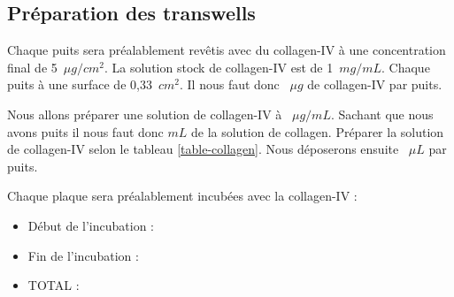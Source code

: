 \subsection{Préparation des transwells}

Chaque puits sera préalablement revêtis avec du collagen-IV à une concentration final de 5~$\mu g/cm^2$. La solution stock de collagen-IV est de  1~$mg/mL$. Chaque puits à une surface de 0,33~$cm^2$. Il nous faut donc ~$\mu g$ de collagen-IV par puits.


Nous allons préparer une solution de collagen-IV à ~$\mu g/mL$. Sachant que nous avons  puits il nous faut donc  $mL$ de la solution de collagen. Préparer la solution de collagen-IV selon le tableau \ref{table-collagen}. Nous déposerons ensuite ~$\mu L$ par puits.


\begin{table}[H]
\caption{Dilution de la collagen-IV}
\label{table-collagen}
\end{table}

Chaque plaque sera préalablement incubées avec la collagen-IV : 

\begin{itemize}
\item Début de l'incubation : 
\item Fin de l'incubation : 
\item TOTAL : 
\end{itemize}
